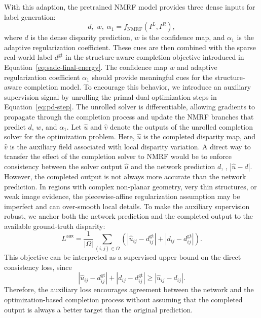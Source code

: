 With this adaption, the pretrained NMRF model provides three dense inputs for label generation:
\begin{equation}
	d,\; w,\; \alpha_1
	=
	f_{\mathrm{NMRF}}(I^L,I^R),
	\label{eq:sadc-nmrf-cues}
\end{equation}
where $d$ is the dense disparity prediction, $w$ is the confidence map, and $\alpha_1$ is the adaptive regularization coefficient.
These cues are then combined with the sparse real-world label $d^{\mathrm{gt}}$ in the structure-aware completion objective introduced in Equation~\ref{eq:sadc-final-energy}.
The confidence map $w$ and adaptive regularization coefficient $\alpha_1$ should provide meaningful cues for the structure-aware completion model.
To encourage this behavior, we introduce an auxiliary supervision signal by unrolling the primal-dual optimization steps in Equation~\ref{eq:pd-step}.
The unrolled solver is differentiable, allowing gradients to propagate through the completion process and update the NMRF branches that predict $d$, $w$, and $\alpha_1$.
Let $\hat{u}$ and $\hat{v}$ denote the outputs of the unrolled completion solver for the optimization problem.
Here, $\hat{u}$ is the completed disparity map, and $\hat{v}$ is the auxiliary field associated with local disparity variation.
A direct way to transfer the effect of the completion solver to NMRF would be to enforce consistency between the solver output $\hat{u}$ and the network prediction $d$, \ie, $|\hat{u}-d|$.
However, the completed output is not always more accurate than the network prediction.
In regions with complex non-planar geometry, very thin structures, or weak image evidence, the piecewise-affine regularization assumption may be imperfect and can over-smooth local details.
To make the auxiliary supervision robust, we anchor both the network prediction and the completed output to the available ground-truth disparity:
\begin{equation}
	L^{\textsf{aux}}
	=
	\frac{1}{|\Omega|}
	\sum_{(i,j)\in\Omega}
	\left(
	|\hat{u}_{ij}-d^{\mathrm{gt}}_{ij}|
	+
	|d_{ij}-d^{\mathrm{gt}}_{ij}|
	\right).
	\label{eq:loss-aux}
\end{equation}
This objective can be interpreted as a supervised upper bound on the direct consistency loss, since
\begin{equation}
	|\hat{u}_{ij}-d^{\mathrm{gt}}_{ij}|
	+
	|d_{ij}-d^{\mathrm{gt}}_{ij}|
	\geq
	|\hat{u}_{ij}-d_{ij}|.
	\label{eq:aux-upper-bound}
\end{equation}
Therefore, the auxiliary loss encourages agreement between the network and the optimization-based completion process without assuming that the completed output is always a better target than the original prediction.
